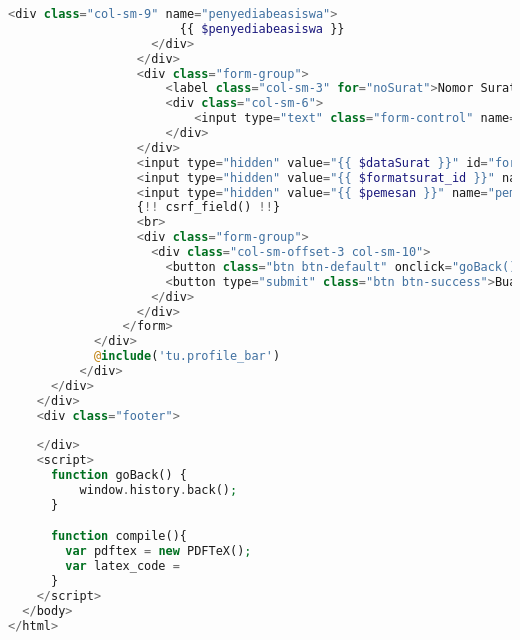\begin{lstlisting}[language=php,basicstyle=\tiny,caption=Tambah nomor surat untuk surat keterangan beasiswa]
                    <div class="col-sm-9" name="penyediabeasiswa">
                        {{ $penyediabeasiswa }}
                    </div>
                  </div>
                  <div class="form-group">
                      <label class="col-sm-3" for="noSurat">Nomor Surat</label>
                      <div class="col-sm-6">
                          <input type="text" class="form-control" name="noSurat" required />
                      </div>
                  </div>
                  <input type="hidden" value="{{ $dataSurat }}" id="format" name="data">
                  <input type="hidden" value="{{ $formatsurat_id }}" name="idFormatSurat">
                  <input type="hidden" value="{{ $pemesan }}" name="pemesan">
                  {!! csrf_field() !!}
                  <br>
                  <div class="form-group">
                    <div class="col-sm-offset-3 col-sm-10">
                      <button class="btn btn-default" onclick="goBack()">Kembali</button>
                      <button type="submit" class="btn btn-success">Buat Surat (PDF)</button>
                    </div>
                  </div>
                </form>
            </div>
            @include('tu.profile_bar')
          </div>
      </div>
    </div>
    <div class="footer">
         
    </div>
    <script>
      function goBack() {
          window.history.back();
      }

      function compile(){
        var pdftex = new PDFTeX();
        var latex_code =
      }
    </script>
  </body>
</html>
\end{lstlisting}

